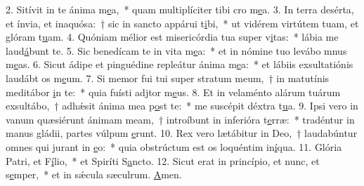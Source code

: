 2. Sitívit in te ánima m\uline{e}a,~* quam multiplíciter tibi cro m\uline{e}a.
3. In terra desérta, et ínvia, et inaquósa:~† sic in sancto appárui t\uline{i}bi,~* ut vidérem virtútem tuam, et glóram t\uline{u}am.
4. Quóniam mélior est misericórdia tua super v\uline{i}tas:~* lábia me laud\uline{á}bunt te.
5. Sic benedícam te in vita m\uline{e}a:~* et in nómine tuo levábo mnus m\uline{e}as.
6. Sicut ádipe et pinguédine repleátur ánima m\uline{e}a:~* et lábiis exsultatiónis laudábt os m\uline{e}um.
7. Si memor fui tui super stratum meum,~† in matutínis meditábor \uline{i}n te:~* quia fuísti adjtor m\uline{e}us.
8. Et in velaménto alárum tuárum exsultábo,~† adhǽsit ánima mea p\uline{o}st te:~* me suscépit déxtra t\uline{u}a.
9. Ipsi vero in vanum quæsiérunt ánimam meam,~† introíbunt in inferióra t\uline{e}rræ:~* tradéntur in manus gládii, partes vúlpum \uline{e}runt.
10. Rex vero lætábitur in Deo,~† laudabúntur omnes qui jurant in \uline{e}o:~* quia obstrúctum est os loquéntim in\uline{í}qua.
11. Glória Patri, et F\uline{í}lio,~* et Spiríti S\uline{a}ncto.
12. Sicut erat in princípio, et nunc, et s\uline{e}mper,~* et in sǽcula sæculrum. \uline{A}men.
